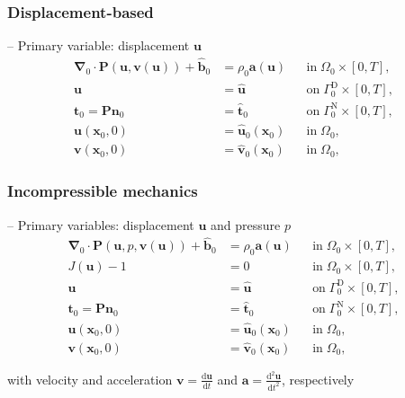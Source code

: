 \documentclass[a4paper,12pt]{report}
\newcommand{\bs}[1]{\boldsymbol{#1}}
\newcommand{\Om}{\mathit{\Omega}}
\newcommand{\Gm}{\mathit{\Gamma}}
\begin{document}
\subsubsection{Displacement-based}
-- Primary variable: displacement $\bs{u}$
\begin{align}
\bs{\nabla}_{0} \cdot \bs{P}(\bs{u},\bs{v}(\bs{u})) + \hat{\bs{b}}_{0} &= \rho_{0} \bs{a}(\bs{u}) &&\text{in} \; \mathit{\Omega}_{0} \times [0, T], \label{eq:divP} \\
\bs{u} &= \hat{\bs{u}} &&\text{on} \; \mathit{\Gamma}_{0}^{\mathrm{D}} \times [0, T], \label{eq:bc_u}\\
\bs{t}_{0} = \bs{P}\bs{n}_{0} &= \hat{\bs{t}}_{0} &&\text{on} \; \mathit{\Gamma}_{0}^{\mathrm{N}} \times [0, T], \label{eq:bc_N}\\
\bs{u}(\bs{x}_{0},0) &= \hat{\bs{u}}_{0}(\bs{x}_{0}) &&\text{in} \; \mathit{\Omega}_{0}, \label{eq:ini_u}\\
\bs{v}(\bs{x}_{0},0) &= \hat{\bs{v}}_{0}(\bs{x}_{0}) &&\text{in} \; \mathit{\Omega}_{0}, \label{eq:ini_v}
\end{align}

\subsubsection{Incompressible mechanics}
-- Primary variables: displacement $\bs{u}$ and pressure $p$
\begin{align}
\bs{\nabla}_{0} \cdot \bs{P}(\bs{u},p,\bs{v}(\bs{u})) + \hat{\bs{b}}_{0} &= \rho_{0} \bs{a}(\bs{u}) &&\text{in} \; \mathit{\Omega}_{0} \times [0, T], \label{eq:divP_inc} \\
J(\bs{u})-1 &= 0 &&\text{in} \; \mathit{\Omega}_{0} \times [0, T], \label{eq:J} \\
\bs{u} &= \hat{\bs{u}} &&\text{on} \; \mathit{\Gamma}_{0}^{\mathrm{D}} \times [0, T], \label{eq:bc_u_inc}\\
\bs{t}_{0} = \bs{P}\bs{n}_{0} &= \hat{\bs{t}}_{0} &&\text{on} \; \mathit{\Gm}_{0}^{\mathrm{N}} \times [0, T], \label{eq:bc_N_inc}\\
\bs{u}(\bs{x}_{0},0) &= \hat{\bs{u}}_{0}(\bs{x}_{0}) &&\text{in} \; \mathit{\Om}_{0}, \label{eq:ini_u_inc}\\
\bs{v}(\bs{x}_{0},0) &= \hat{\bs{v}}_{0}(\bs{x}_{0}) &&\text{in} \; \mathit{\Om}_{0}, \label{eq:ini_v_inc}
\end{align}

with velocity and acceleration $\bs{v}=\frac{\mathrm{d}\bs{u}}{\mathrm{d}t}$ and $\bs{a}=\frac{\mathrm{d}^2\bs{u}}{\mathrm{d}t^2}$, respectively
\end{document}

